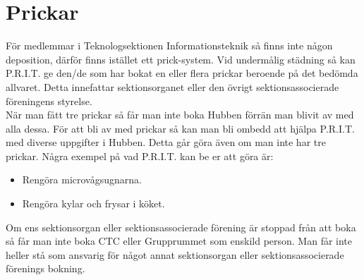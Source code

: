 \section{Prickar}
För medlemmar i Teknologsektionen Informationsteknik så finns inte någon deposition, därför finns istället ett prick-system. 
Vid undermålig städning så kan P.R.I.T. ge den/de som har bokat en eller flera prickar beroende på det bedömda allvaret. 
Detta innefattar sektionsorganet eller den övrigt sektionsassocierade föreningens styrelse.\\
När man fått tre prickar så får man inte boka Hubben förrän man blivit av med alla dessa.
För att bli av med prickar så kan man bli ombedd att hjälpa P.R.I.T. med diverse uppgifter i Hubben. Detta går göra även om man inte har tre prickar.
Några exempel på vad P.R.I.T. kan be er att göra är: 
\begin{itemize}
    \item Rengöra microvågsugnarna.
    \item Rengöra kylar och frysar i köket.
\end{itemize}
Om ens sektionsorgan eller sektionsassocierade förening är stoppad från att boka så får man inte boka CTC eller Grupprummet som enskild person. Man får inte heller stå som ansvarig för något annat sektionsorgan eller sektionsassocierade förenings bokning.
